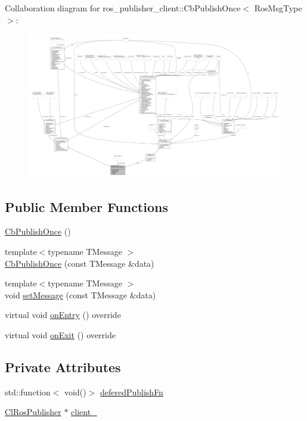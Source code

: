 Collaboration diagram for ros\+\_\+publisher\+\_\+client\+:\+:Cb\+Publish\+Once$<$ Ros\+Msg\+Type $>$\+:
\nopagebreak
\begin{figure}[H]
\begin{center}
\leavevmode
\includegraphics[width=350pt]{classros__publisher__client_1_1CbPublishOnce__coll__graph}
\end{center}
\end{figure}
\subsection*{Public Member Functions}
\begin{DoxyCompactItemize}
\item 
\hyperlink{classros__publisher__client_1_1CbPublishOnce_a7e58cbae17032aef05161697b7a061c5}{Cb\+Publish\+Once} ()
\item 
{\footnotesize template$<$typename T\+Message $>$ }\\\hyperlink{classros__publisher__client_1_1CbPublishOnce_a354897ea9a30ab5d95acc8837bf9ef0f}{Cb\+Publish\+Once} (const T\+Message \&data)
\item 
{\footnotesize template$<$typename T\+Message $>$ }\\void \hyperlink{classros__publisher__client_1_1CbPublishOnce_a06bef500e116390ee85a790401e600d8}{set\+Message} (const T\+Message \&data)
\item 
virtual void \hyperlink{classros__publisher__client_1_1CbPublishOnce_a223cb50cd7e4041d42106eb600575bae}{on\+Entry} () override
\item 
virtual void \hyperlink{classros__publisher__client_1_1CbPublishOnce_a879c967bb3e5e894e61256629636fcbd}{on\+Exit} () override
\end{DoxyCompactItemize}
\subsection*{Private Attributes}
\begin{DoxyCompactItemize}
\item 
std\+::function$<$ void()$>$ \hyperlink{classros__publisher__client_1_1CbPublishOnce_a91e0e3d574d25e160bcb3a4ca81bb0b2}{defered\+Publish\+Fn}
\item 
\hyperlink{classros__publisher__client_1_1ClRosPublisher}{Cl\+Ros\+Publisher} $\ast$ \hyperlink{classros__publisher__client_1_1CbPublishOnce_a50a1b2a4892ad780406231e0f870746a}{client\+\_\+}
\end{DoxyCompactItemize}
